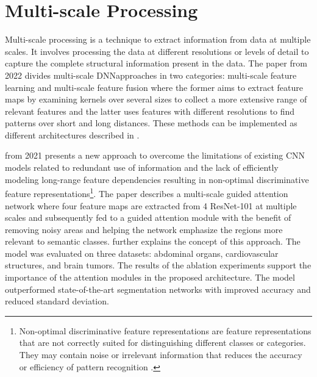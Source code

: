 \section{Multi-scale Processing}
Multi-scale processing is a technique to extract information from data at multiple scales. It involves processing the data at different resolutions or levels of detail to capture the complete structural information present in the data. The paper \cite{Elizar2022-ey} from 2022 divides multi-scale \ac{DNN}approaches in two categories: multi-scale feature learning and multi-scale feature fusion where the former aims to extract feature maps by examining kernels over several sizes to collect a more extensive range of relevant features and the latter uses features with different resolutions to find patterns over short and long distances. These methods can be implemented as different architectures described in .

 \cite{9066969} from 2021 presents a new approach to overcome the limitations of existing \ac{CNN} models related to redundant use of information and the lack of efficiently modeling long-range feature dependencies resulting in non-optimal discriminative feature representations\footnote{Non-optimal discriminative feature representations are feature representations that are not correctly suited for distinguishing different classes or categories\cite{chen2017discriminative}. They may contain noise or irrelevant information that reduces the accuracy or efficiency of pattern recognition \cite{Guo2020}.}. The paper describes a multi-scale guided attention network where four feature maps are extracted from 4 ResNet-101 at multiple scales and subsequently fed to a guided attention module with the benefit of removing noisy areas and helping the network emphasize the regions more relevant to semantic classes.  further explains the concept of this approach. The model was evaluated on three datasets: abdominal organs, cardiovascular structures, and brain tumors. The results of the ablation experiments support the importance of the attention modules in the proposed architecture. The model outperformed state-of-the-art segmentation networks with improved accuracy and reduced standard deviation.

